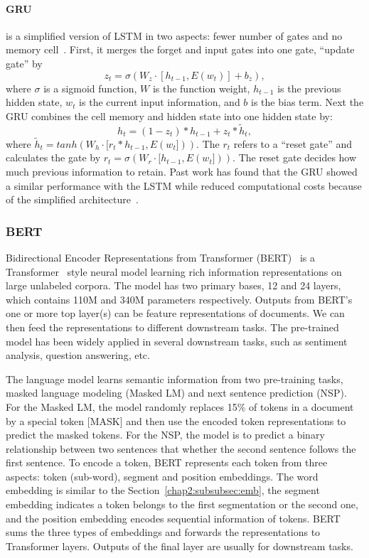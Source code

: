 \paragraph{GRU} is a simplified version of LSTM in two aspects: fewer number of gates and no memory cell~\cite{chung2014empirical}.
First, it merges the forget and input gates into one gate, ``update gate'' by
$$z_t = \sigma(W_z \cdot [h_{t-1}, E(w_t)] + b_z),$$
where $\sigma$ is a sigmoid function, $W$ is the function weight, $h_{t-1}$ is the previous hidden state, $w_t$ is the current input information, and $b$ is the bias term.
Next the GRU combines the cell memory and hidden state into one hidden state by:
$$h_t = (1-z_t) * h_{t-1} + z_t * \tilde{h}_t,$$
where $\tilde{h}_t = tanh(W_h \cdot [r_t * h_{t-1}, E(w_t]))$.
The $r_t$ refers to a ``reset gate'' and calculates the gate by $r_t = \sigma(W_r \cdot [h_{t-1}, E(w_t]))$.
The reset gate decides how much previous information to retain.
Past work has found that the GRU showed a similar performance with the LSTM while reduced computational costs because of the simplified architecture~\cite{chung2014empirical}.


\subsubsection{BERT} 
Bidirectional Encoder Representations from Transformer (BERT)~\cite{devlin2019bert} is a Transformer~\cite{vaswani2017attention} style neural model learning rich information representations on large unlabeled corpora.
The model has two primary bases, 12 and 24 layers, which contains 110M and 340M parameters respectively.
Outputs from BERT's one or more top layer(s) can be feature representations of documents.
We can then feed the representations to different downstream tasks.
The pre-trained model has been widely applied in several downstream tasks, such as sentiment analysis, question answering, etc.

The language model learns semantic information from two pre-training tasks, masked language modeling (Masked LM) and next sentence prediction (NSP). 
For the Masked LM, the model randomly replaces 15\% of tokens in a document by a special token [MASK] and then use the encoded token representations to predict the masked tokens.
For the NSP, the model is to predict a binary relationship between two sentences that whether the second sentence follows the first sentence.
To encode a token, BERT represents each token from three aspects: token (sub-word), segment and position embeddings.
The word embedding is similar to the Section~\ref{chap2:subsubsec:emb}, the segment embedding indicates a token belongs to the first segmentation or the second one, and the position embedding encodes sequential information of tokens.
BERT sums the three types of embeddings and forwards the representations to Transformer layers.
Outputs of the final layer are usually for downstream tasks.



